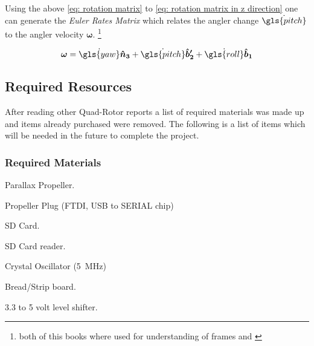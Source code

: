 Using the above \eqref{eq: rotation matrix} to \eqref{eq: rotation matrix in z direction} one can generate the \textit{Euler Rates Matrix} which relates the angler change $\dot{\gls{pitch}}$ to the angler velocity $\bm{\omega}$. \footnote{both of this books where used for understanding of frames \cite{cai2011unmanned} and \cite[pg.~2-27]{jekeli2001inertial}} 

\begin{equation}
\bm{\omega} = \dot{\gls{yaw}} \bm{\hat{n}_3}+\dot{\gls{pitch}}\bm{\hat{b}'_2} + \dot{\gls{roll}}\hm{\hat{b}_1}
\end{equation}


 \tocless\subsection{Required Resources}

After reading other Quad-Rotor reports a list of required materials was made up and items already purchased were removed. The following is a list of items which will be needed in the future to complete the project.

 \tocless\subsubsection{Required Materials}
\begin{itemize*}
\item Parallax Propeller.
\item Propeller Plug (FTDI, USB to SERIAL chip)
\item SD Card.
\item SD Card reader. 
\item Crystal Oscillator (\SI[mode=text]{5}{\mega\Hz})
\item Bread/Strip board.
\item 3.3 to 5 volt level shifter.
\end{itemize*}
